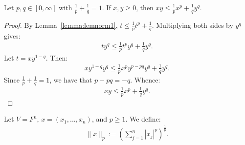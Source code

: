     \begin{lemma}
        Let $p,q \in [0,\infty]$ with $\frac{1}{p} + \frac{1}{q} = 1$. If $x,y \geq 0$, then $xy \leq \frac{1}{p}x^p + \frac{1}{q}y^q$. 
    \end{lemma}
        \begin{proof}
            By Lemma~\ref{lemma:lemnorm1}, $t \leq \frac{1}{p}t^p + \frac{1}{q}$. Multiplying both sides by $y^q$ gives:
                \begin{equation*}
                \begin{split}
                    ty^q \leq \frac{1}{p}t^p y^q + \frac{1}{q}y^q.
                \end{split}
                \end{equation*}
            Let $t = xy^{1-q}$. Then:
                \begin{equation*}
                \begin{split}
                    xy^{1-q}y^q \leq \frac{1}{p}x^p y^{p-pq}y^q + \frac{1}{q}y^q.
                \end{split}
                \end{equation*}
            Since $\frac{1}{p} + \frac{1}{q} = 1$, we have that $p-pq = -q$. Whence:
                \begin{equation*}
                \begin{split}
                    xy \leq \frac{1}{p}x^p + \frac{1}{q}y^q.
                \end{split}
                \end{equation*}
        \end{proof}

    \begin{definition}
        Let $V = F^n$, $x = (x_1,...,x_n)$, and $p \geq 1$. We define:
            \begin{equation*}
            \begin{split}
                \lVert x \rVert _p := \left( \sum_{j = 1}^n |x_j|^p \right)^\frac{1}{p}.
            \end{split}
            \end{equation*}
    \end{definition}

